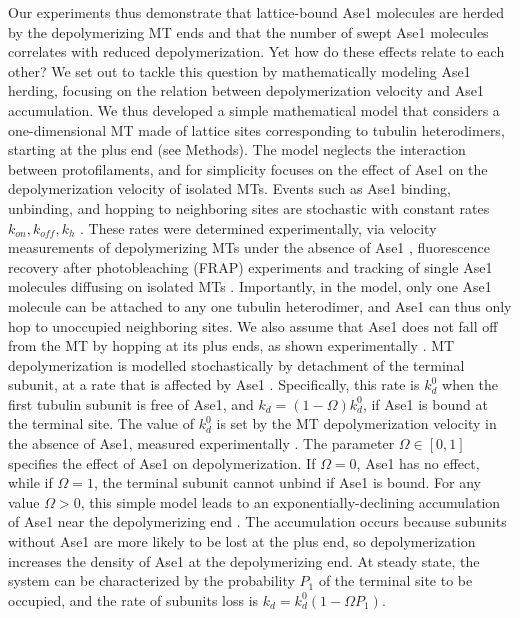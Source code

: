 Our experiments thus demonstrate that lattice-bound Ase1 molecules are herded by the depolymerizing MT ends and that the number of swept Ase1 molecules correlates with reduced depolymerization. Yet how do these effects relate to each other? We set out to tackle this question by mathematically modeling Ase1 herding, focusing on the relation between depolymerization velocity and Ase1 accumulation. We thus developed a simple mathematical model that considers a one-dimensional MT made of lattice sites corresponding to tubulin heterodimers, starting at the plus end (see Methods). The model neglects the interaction between protofilaments, and for simplicity focuses on the effect of Ase1 on the depolymerization velocity of isolated MTs. Events such as Ase1 binding, unbinding, and hopping to neighboring sites are stochastic with constant rates $k_{on},k_{off},k_h$ . These rates were determined experimentally, via velocity measurements of depolymerizing MTs under the absence of Ase1 , fluorescence recovery after photobleaching (FRAP) experiments  and tracking of single Ase1 molecules diffusing on isolated MTs . Importantly, in the model, only one Ase1 molecule can be attached to any one tubulin heterodimer, and Ase1 can thus only hop to unoccupied neighboring sites. We also assume that Ase1 does not fall off from the MT by hopping at its plus ends, as shown experimentally \parencite{Braun2011}. MT depolymerization is modelled stochastically by detachment of the terminal subunit, at a rate that is affected by Ase1 . Specifically, this rate is $k_d^0$ when the first tubulin subunit is free of Ase1, and $k_d=(1-\Omega)k_d^0$, if Ase1 is bound at the terminal site. The value of $k_d^0$ is set by the MT depolymerization velocity in the absence of Ase1, measured experimentally . The parameter $\Omega\in[0,1]$ specifies the effect of Ase1 on depolymerization. If $\Omega=0$, Ase1 has no effect, while if $\Omega=1$, the terminal subunit cannot unbind if Ase1 is bound. For any value $\Omega>0$, this simple model leads to an exponentially-declining accumulation of Ase1 near the depolymerizing end . The accumulation occurs because subunits without Ase1 are more likely to be lost at the plus end, so depolymerization increases the density of Ase1 at the depolymerizing end. At steady state, the system can be characterized by the probability $P_1$ of the terminal site to be occupied, and the rate of subunits loss is $k_d=k_d^0 (1-\Omega P_1)$.\par

